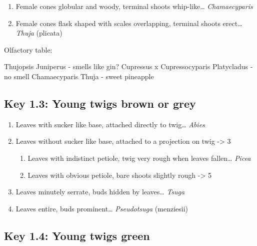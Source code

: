 \documentclass[openany]{book}
\providecommand{\tightlist}{%
  \setlength{\itemsep}{0pt}\setlength{\parskip}{0pt}}
\begin{document}
\begin{enumerate}
  \begin{enumerate}
  \def\labelenumii{\arabic{enumii}.}
  \setcounter{enumii}{10}
  \tightlist
  \item
    Female cones globular and woody, terminal shoots whip-like\ldots{}
    \emph{Chamaecyparis}
  \item
    Female cones flask shaped with scales overlapping, terminal shoots
    erect\ldots{} \emph{Thuja} (plicata)
  \end{enumerate}
\end{enumerate}

Olfactory table:

Thujopsis Juniperus - smells like gin? Cupressus x Cupressocyparis
Platycladus - no smell Chamaecyparis Thuja - sweet pineapple

\hypertarget{key-1.3-young-twigs-brown-or-grey-1}{%
\subsection{Key 1.3: Young twigs brown or
grey}\label{key-1.3-young-twigs-brown-or-grey-1}}

\begin{enumerate}
\def\labelenumi{\arabic{enumi}.}
\tightlist
\item
  Leaves with sucker like base, attached directly to twig\ldots{}
  \emph{Abies}
\item
  Leaves without sucker like base, attached to a projection on twig
  -\textgreater{} 3

  \begin{enumerate}
  \def\labelenumii{\arabic{enumii}.}
  \setcounter{enumii}{2}
  \tightlist
  \item
    Leaves with indistinct petiole, twig very rough when leaves
    fallen\ldots{} \emph{Picea}
  \item
    Leaves with obvious petiole, bare shoots slightly rough
    -\textgreater{} 5
  \end{enumerate}
\item
  Leaves minutely serrate, buds hidden by leaves\ldots{} \emph{Tsuga}
\item
  Leaves entire, buds prominent\ldots{} \emph{Pseudotsuga} (menziesii)
\end{enumerate}

\hypertarget{key-1.4-young-twigs-green-1}{%
\subsection{Key 1.4: Young twigs
green}\label{key-1.4-young-twigs-green-1}}
\end{document}
